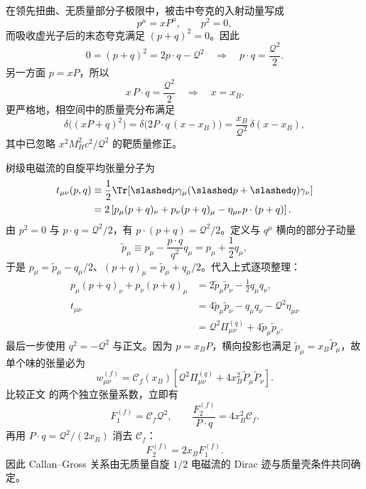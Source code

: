 \begin{derivation}[深度非弹性散射的树级结构函数]
在领先扭曲、无质量部分子极限中，被击中夸克的入射动量写成
\begin{equation*}
 p^\mu=xP^\mu,
 \qquad p^2=0,
\end{equation*}
而吸收虚光子后的末态夸克满足 $(p+q)^2=0$。因此
\begin{equation*}
 0=(p+q)^2=2p\cdot q-\mathcal Q^2
 \quad\Longrightarrow\quad
 p\cdot q=\frac{\mathcal Q^2}{2}.
\end{equation*}
另一方面 $p=xP$，所以
\begin{equation*}
 x\,P\cdot q=\frac{\mathcal Q^2}{2}
 \quad\Longrightarrow\quad x=x_B.
\end{equation*}
更严格地，相空间中的质量壳分布满足
\begin{equation*}
 \delta\!\bigl((xP+q)^2\bigr)
 =\delta\!\bigl(2P\cdot q\,(x-x_B)\bigr)
 =\frac{x_B}{\mathcal Q^2}\,\delta(x-x_B),
\end{equation*}
其中已忽略 $x^2M_H^2c^2/\mathcal Q^2$ 的靶质量修正。

树级电磁流的自旋平均张量分子为
\begin{align*}
 t_{\mu\nu}(p,q)
 &\equiv \frac12\Tr\!\left[\slashed p\gamma_\mu(\slashed p+\slashed q)\gamma_\nu\right]\\
 &=2\left[p_\mu(p+q)_\nu+p_\nu(p+q)_\mu
 -\eta_{\mu\nu}p\cdot(p+q)\right].
\end{align*}
由 $p^2=0$ 与 $p\cdot q=\mathcal Q^2/2$，有 $p\cdot(p+q)=\mathcal Q^2/2$。定义与 $q^\mu$ 横向的部分子动量
\begin{equation*}
 \widetilde p_\mu
 \equiv p_\mu-\frac{p\cdot q}{q^2}q_\mu
 =p_\mu+\frac12q_\mu,
\end{equation*}
于是 $p_\mu=\widetilde p_\mu-q_\mu/2$、$(p+q)_\mu=\widetilde p_\mu+q_\mu/2$。代入上式逐项整理：
\begin{align*}
 p_\mu(p+q)_\nu+p_\nu(p+q)_\mu
 &=2\widetilde p_\mu\widetilde p_\nu-\frac12q_\mu q_\nu,\\
 t_{\mu\nu}
 &=4\widetilde p_\mu\widetilde p_\nu-q_\mu q_\nu-\mathcal Q^2\eta_{\mu\nu}\\
 &=\mathcal Q^2\Pi_{\mu\nu}^{(q)}+4\widetilde p_\mu\widetilde p_\nu.
\end{align*}
最后一步使用 $q^2=-\mathcal Q^2$ 与正文。因为 $p=x_BP$，横向投影也满足 $\widetilde p_\mu=x_B\widetilde P_\mu$，故单个味的张量必为
\begin{equation*}
 w_{\mu\nu}^{(f)}
 =\mathcal C_f(x_B)
 \left[
 \mathcal Q^2\Pi_{\mu\nu}^{(q)}
 +4x_B^2\widetilde P_\mu\widetilde P_\nu
 \right].
\end{equation*}
比较正文 的两个独立张量系数，立即有
\begin{equation*}
 F_1^{(f)}=\mathcal C_f\mathcal Q^2,
 \qquad
 \frac{F_2^{(f)}}{P\cdot q}=4x_B^2\mathcal C_f.
\end{equation*}
再用 $P\cdot q=\mathcal Q^2/(2x_B)$ 消去 $\mathcal C_f$：
\begin{equation*}
 {F_2^{(f)}=2x_BF_1^{(f)}}.
\end{equation*}
因此 Callan--Gross 关系由无质量自旋 $1/2$ 电磁流的 Dirac 迹与质量壳条件共同确定。


\end{derivation}
